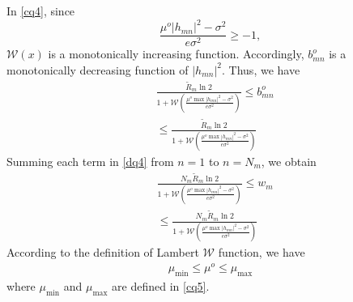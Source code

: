 \documentclass[journal]{IEEEtran}
\begin{document}
In \eqref{cq4}, since
\begin{equation}
\frac{\mu^o\left|h_{mn}\right|^2 - \sigma^2}{e\sigma^2}\geq-1,
\end{equation}
$\mathcal{W}\left(x\right)$ is a monotonically increasing function. Accordingly, $b_{mn}^o$ is a monotonically decreasing function of $\left|h_{mn}\right|^2$. Thus, we have
\begin{align}\label{dq4}
&\frac{\tilde{R}_m\ln2}{1 + \mathcal{W}\left(\frac{\mu^o\max\left|h_{mn}\right|^2 - \sigma^2}{e\sigma^2}\right)}\leq b_{mn}^o \nonumber\\ &\leq  \frac{\tilde{R}_m\ln2}{1 + \mathcal{W}\left(\frac{\mu^o\max\left|h_{mn}\right|^2 - \sigma^2}{e\sigma^2}\right)}
\end{align}
Summing each term in \eqref{dq4} from $n=1$ to $n= N_m$, we obtain
\begin{align}
&\frac{N_m\tilde{R}_m\ln2}{1 + \mathcal{W}\left(\frac{\mu^o\max\left|h_{mn}\right|^2 - \sigma^2}{e\sigma^2}\right)}\leq w_{m} \nonumber\\ &\leq  \frac{N_m\tilde{R}_m\ln2}{1 + \mathcal{W}\left(\frac{\mu^o\max\left|h_{mn}\right|^2 - \sigma^2}{e\sigma^2}\right)}
\end{align}
According to the definition of Lambert $\mathcal{W}$ function, we have
\begin{align}
\mu_{\min} \leq \mu^o \leq \mu_{\max}
\end{align}
where $\mu_{\min}$ and $\mu_{\max}$ are defined in \eqref{cq5}.
\end{document}
